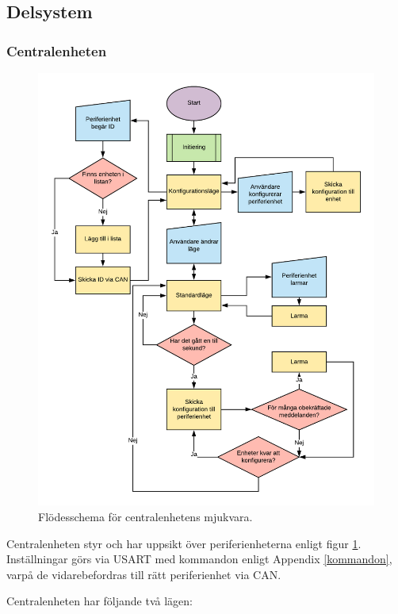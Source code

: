 \documentclass{article}
\begin{document}
\subsection{Delsystem }
\subsubsection{Centralenheten}

\begin{figure}[H]
    \centering
    \includegraphics[scale=0.4]{figurer/Centralenhet.png}
    \caption{Flödesschema för centralenhetens mjukvara.}
    \label{fig:centralflöde}
\end{figure}

Centralenheten styr och har uppsikt över periferienheterna enligt figur \ref{fig:centralflöde}.
Inställningar görs via USART med kommandon enligt Appendix \ref{kommandon}, varpå de vidarebefordras till rätt periferienhet via CAN.

Centralenheten har följande två lägen:
\end{document}
